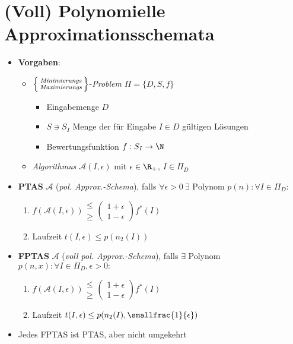 \section{(Voll) Polynomielle Approximationsschemata}

\begin{itemize}
  \item \textbf{Vorgaben}:
  \begin{itemize}
    \item $ \left\{ \begin{smallmatrix}
      \text{\emph{Minimierungs}} \\
      \text{\emph{Maximierungs}}
    \end{smallmatrix} \right\} $-\emph{Problem} $ \Pi = \{ D, S, f \} $
    \begin{itemize}
      \item Eingabemenge $ D $
      \item $ S \ni S_I $ Menge der für Eingabe $ I \in D $ gültigen Lösungen
      \item Bewertungsfunktion $ f: S_I \to \N $
    \end{itemize}
    \item \emph{Algorithmus} $ \mathcal{A}(I,\epsilon) $ mit $ \epsilon \in \R_{+} $, $ I \in \Pi_D $
  \end{itemize}
  \item \textbf{PTAS} $ \mathcal{A} $ (\emph{pol. Approx.-Schema}), falls $ \forall \epsilon > 0 \ \exists \text{ Polynom } p(n) : \forall I \in \Pi_D: $
  \begin{enumerate}
    \item $ f(\mathcal{A}(I,\epsilon))\begin{smallmatrix}
      \leq \\ \geq
    \end{smallmatrix}\left( \begin{smallmatrix}
      1+\epsilon \\
      1-\epsilon
    \end{smallmatrix} \right)f^*(I) $ 
    \item Laufzeit $ t(I, \epsilon) \leq p(n_2(I)) $
  \end{enumerate}
  \item \textbf{FPTAS} $ \mathcal{A} $ (\emph{voll pol. Approx.-Schema}), falls $ \exists $ Polynom $ p(n,x) : \forall I \in \Pi_D, \epsilon > 0: $
  \begin{enumerate}
    \item $ f(\mathcal{A}(I,\epsilon))\begin{smallmatrix}
      \leq \\ \geq
    \end{smallmatrix}\left( \begin{smallmatrix}
      1+\epsilon \\
      1-\epsilon
    \end{smallmatrix} \right)f^*(I) $
    \item Laufzeit $ t(I,\epsilon) \leq p(n_2(I),\smallfrac{1}{\epsilon}) $
  \end{enumerate}
  \item Jedes FPTAS ist PTAS, aber nicht umgekehrt
\end{itemize}

